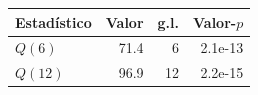 \begin{tabular}{lrrr}
\toprule
Estadístico & Valor & g.l. & Valor-$p$ \\
\midrule
$Q(6)$ & 71.4 & 6 & 2.1e-13 \\
$Q(12)$ & 96.9 & 12 & 2.2e-15 \\
\bottomrule
\end{tabular}
